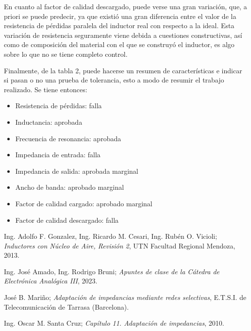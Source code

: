 \documentclass{article}
\begin{document}
En cuanto al factor de calidad descargado, puede verse una gran variación, que, a priori se puede predecir, ya que existió una gran diferencia entre el valor de la resistencia de pérdidas paralela del inductor real con respecto a la ideal. Esta variación de resistencia seguramente viene debida a cuestiones constructivas, así como de composición del material con el que se construyó el inductor, es algo sobre lo que no se tiene completo control.

Finalmente, de la tabla 2, puede hacerse un resumen de características e indicar si pasan o no una prueba de tolerancia, esto a modo de resumir el trabajo realizado. Se tiene entonces:

\begin{itemize}
    \item Resistencia de pérdidas: falla
    \item Inductancia: aprobada
    \item Frecuencia de resonancia: aprobada
    \item Impedancia de entrada: falla
    \item Impedancia de salida: aprobada marginal
    \item Ancho de banda: aprobado marginal
    \item Factor de calidad cargado: aprobado marginal
    \item Factor de calidad descargado: falla
    
\end{itemize}

\newpage

\begin{thebibliography}{9}
Ing. Adolfo F. Gonzalez, Ing. Ricardo M. Cesari, Ing. Rubén O. Vicioli; \emph{Inductores con Núcleo de Aire, Revisión 2}, UTN Facultad Regional Mendoza, 2013.

Ing. José Amado, Ing. Rodrigo Bruni; \emph{Apuntes de clase de la Cátedra de Electrónica Analógica III}, 2023.

José B. Mariño; \emph{Adaptación de impedancias mediante redes selectivas}, E.T.S.I. de Telecomunicación de Tarrasa (Barcelona).

Ing. Oscar M. Santa Cruz; \emph{Capítulo 11. Adaptación de impedancias}, 2010.

\end{thebibliography}
\end{document}
